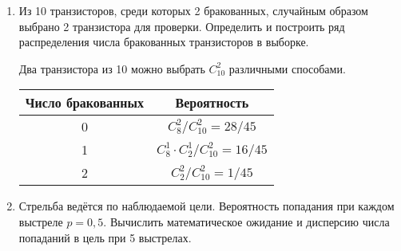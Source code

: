 \begin{enumerate}
\begin{figure}[h]
                \hfill
            \end{figure}
        \item Из 10 транзисторов, среди которых 2 бракованных, случайным образом
            выбрано 2 транзистора для проверки. Определить и построить ряд
            распределения числа бракованных транзисторов в выборке.

            Два транзистора из 10 можно выбрать \( C_{10}^2 \) различными
            способами.
            \begin{table}[h!]
                \center
                \begin{tabular}{|c|c|} \hline
                    Число бракованных & Вероятность \\ \hline
                    0 & \( C_8^2 / C_{10}^2 = 28/45 \) \\
                    1 & \( C_8^1 \cdot C_2^1 / C_{10}^2 = 16/45 \) \\
                    2 & \( C_2^2 / C_{10}^2 = 1/45 \) \\ \hline
                \end{tabular}
            \end{table}

        \item Стрельба ведётся по наблюдаемой цели. Вероятность попадания при
            каждом выстреле \( p = 0,5 \). Вычислить математическое ожидание и
            дисперсию числа попаданий в цель при 5 выстрелах.


\end{enumerate}

